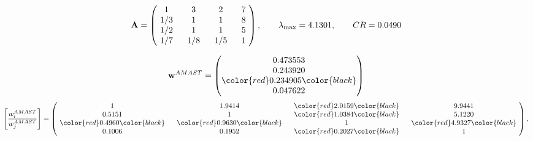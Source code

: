 \begin{example}
\begin{equation*}
\mathbf{A} =
\begin{pmatrix}
$\,\,$ 1 $\,\,$ & $\,\,$3$\,\,$ & $\,\,$2$\,\,$ & $\,\,$7 $\,\,$ \\
$\,\,$ 1/3$\,\,$ & $\,\,$ 1 $\,\,$ & $\,\,$1$\,\,$ & $\,\,$8 $\,\,$ \\
$\,\,$ 1/2$\,\,$ & $\,\,$ 1 $\,\,$ & $\,\,$ 1 $\,\,$ & $\,\,$5 $\,\,$ \\
$\,\,$ 1/7$\,\,$ & $\,\,$ 1/8$\,\,$ & $\,\,$ 1/5$\,\,$ & $\,\,$ 1  $\,\,$ \\
\end{pmatrix},
\qquad
\lambda_{\max} =
4.1301,
\qquad
CR = 0.0490
\end{equation*}

\begin{equation*}
\mathbf{w}^{AMAST} =
\begin{pmatrix}
0.473553\\
0.243920\\
\color{red} 0.234905\color{black} \\
0.047622
\end{pmatrix}\end{equation*}
\begin{equation*}
\left[ \frac{{w}^{AMAST}_i}{{w}^{AMAST}_j} \right] =
\begin{pmatrix}
$\,\,$ 1 $\,\,$ & $\,\,$1.9414$\,\,$ & $\,\,$\color{red} 2.0159\color{black} $\,\,$ & $\,\,$9.9441$\,\,$ \\
$\,\,$0.5151$\,\,$ & $\,\,$ 1 $\,\,$ & $\,\,$\color{red} 1.0384\color{black} $\,\,$ & $\,\,$5.1220  $\,\,$ \\
$\,\,$\color{red} 0.4960\color{black} $\,\,$ & $\,\,$\color{red} 0.9630\color{black} $\,\,$ & $\,\,$ 1 $\,\,$ & $\,\,$\color{red} 4.9327\color{black}  $\,\,$ \\
$\,\,$0.1006$\,\,$ & $\,\,$0.1952$\,\,$ & $\,\,$\color{red} 0.2027\color{black} $\,\,$ & $\,\,$ 1  $\,\,$ \\
\end{pmatrix},
\end{equation*}


\end{example}
